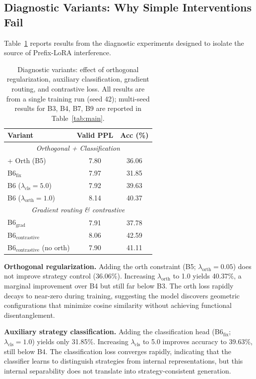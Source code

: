 \documentclass[conference]{IEEEtran}
\begin{document}
\subsection{Diagnostic Variants: Why Simple Interventions Fail}

Table~\ref{tab:diag} reports results from the diagnostic experiments designed to isolate the source of Prefix-LoRA interference.

\begin{table}[t]
\centering
\caption{Diagnostic variants: effect of orthogonal regularization, auxiliary classification, gradient routing, and contrastive loss. All results are from a single training run (seed 42); multi-seed results for B3, B4, B7, B9 are reported in Table~\ref{tab:main}.}
\label{tab:diag}
\begin{tabular}{lcc}
\toprule
\textbf{Variant} & \textbf{Valid PPL} & \textbf{Acc (\%)} \\
\midrule
\multicolumn{3}{c}{\textit{Orthogonal + Classification}} \\
\quad + Orth (B5)             & 7.80  & 36.06 \\
\quad B6$_{\text{fix}}$       & 7.97  & 31.85 \\
\quad B6 ($\lambda_{\text{cls}}{=}5.0$)  & 7.92  & 39.63 \\
\quad B6 ($\lambda_{\text{orth}}{=}1.0$) & 8.14  & 40.37 \\
\midrule
\multicolumn{3}{c}{\textit{Gradient routing \& contrastive}} \\
\quad B6$_{\text{grad}}$      & 7.91  & 37.78 \\
\quad B6$_{\text{contrastive}}$           & 8.06  & 42.59 \\
\quad B6$_{\text{contrastive}}$ (no orth) & 7.90  & 41.11 \\
\bottomrule
\end{tabular}
\end{table}

\textbf{Orthogonal regularization.} Adding the orth constraint (B5; $\lambda_{\text{orth}}=0.05$) does not improve strategy control (36.06\%). Increasing $\lambda_{\text{orth}}$ to 1.0 yields 40.37\%, a marginal improvement over B4 but still far below B3. The orth loss rapidly decays to near-zero during training, suggesting the model discovers geometric configurations that minimize cosine similarity without achieving functional disentanglement.

\textbf{Auxiliary strategy classification.} Adding the classification head (B6$_{\text{fix}}$; $\lambda_{\text{cls}}=1.0$) yields only 31.85\%. Increasing $\lambda_{\text{cls}}$ to 5.0 improves accuracy to 39.63\%, still below B4. The classification loss converges rapidly, indicating that the classifier learns to distinguish strategies from internal representations, but this internal separability does not translate into strategy-consistent generation.
\end{document}
